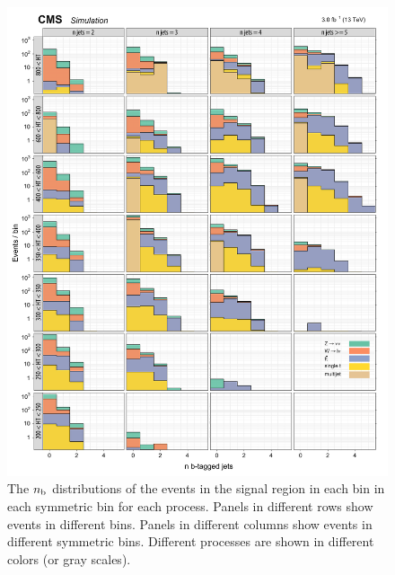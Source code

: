 \begin{figure}[!h]
\centering
\includegraphics[scale=0.95]{figures/kiplots/c150107_s150318_f015_nbjets_100}
\caption{The $\nb$ distributions of the events in the signal region in
each \scalht bin in each symmetric \njet bin for each process. Panels
in different rows show events in different \scalht bins. Panels in
different columns show events in different symmetric \njet bins.
Different processes are shown in different colors (or gray scales).}
\label{c150107_s150318_f015_nbjets_100}
\end{figure}

